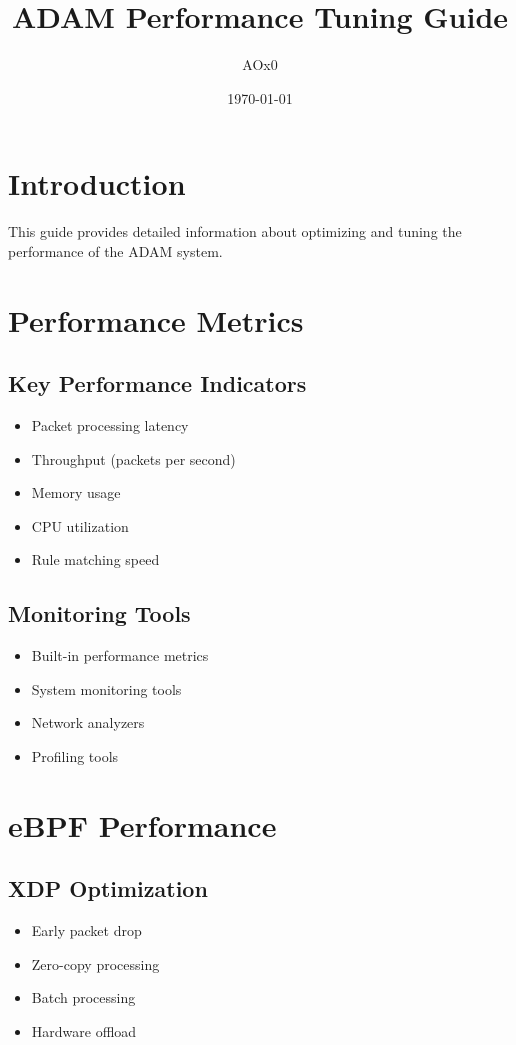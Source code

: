 \documentclass{article}
\title{ADAM Performance Tuning Guide}
\author{AOx0}
\date{\today}
\begin{document}
\maketitle

\section{Introduction}
This guide provides detailed information about optimizing and tuning the performance of the ADAM system.

\section{Performance Metrics}

\subsection{Key Performance Indicators}
\begin{itemize}
    \item Packet processing latency
    \item Throughput (packets per second)
    \item Memory usage
    \item CPU utilization
    \item Rule matching speed
\end{itemize}

\subsection{Monitoring Tools}
\begin{itemize}
    \item Built-in performance metrics
    \item System monitoring tools
    \item Network analyzers
    \item Profiling tools
\end{itemize}

\section{eBPF Performance}

\subsection{XDP Optimization}
\begin{itemize}
    \item Early packet drop
    \item Zero-copy processing
    \item Batch processing
    \item Hardware offload
\end{itemize}
\end{document}
